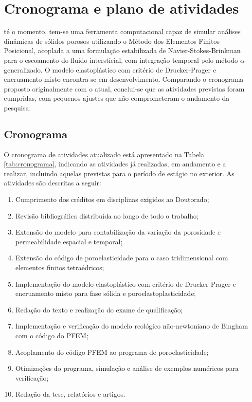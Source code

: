 \chapter{Cronograma e plano de atividades}

té o momento, tem-se uma ferramenta computacional capaz de simular análises dinâmicas de sólidos porosos utilizando o Método dos Elementos Finitos Posicional, acoplada a uma formulação estabilizada de Navier-Stokes-Brinkman para o escoamento do fluido intersticial, com integração temporal pelo método $\alpha$-generalizado. O modelo elastoplástico com critério de Drucker-Prager e encruamento misto encontra-se em desenvolvimento. Comparando o cronograma proposto originalmente com o atual, conclui-se que as atividades previstas foram cumpridas, com pequenos ajustes que não comprometeram o andamento da pesquisa.

\section{Cronograma}

O cronograma de atividades atualizado está apresentado na Tabela \ref{tab:cronograma}, indicando as atividades já realizadas, em andamento e a realizar, incluindo aquelas previstas para o período de estágio no exterior. As atividades são descritas a seguir:

\begin{enumerate}[label=\alph*),leftmargin=\parindent,labelwidth=\parindent,labelsep=0.3cm,noitemsep]
    \item\label{disciplinas} Cumprimento dos créditos em disciplinas exigidos ao Doutorado;
    \item\label{revisao} Revisão bibliográfica distribuída ao longo de todo o trabalho;
    \item\label{porosidade} Extensão do modelo para contabilização da variação da porosidade e permeabilidade espacial e temporal;
    \item\label{extensao3d} Extensão do código de poroelasticidade para o caso tridimensional com elementos finitos tetraédricos;
    \item\label{drucker} Implementação do modelo elastoplástico com critério de Drucker-Prager e encruamento misto para fase sólida e poroelastoplasticidade;
    \item\label{quali} Redação do texto e realização do exame de qualificação;
    \item\label{bingham} Implementação e verificação do modelo reológico não-newtoniano de Bingham com o código do PFEM;
    \item\label{acoplamento} Acoplamento do código PFEM ao programa de poroelasticidade;
    \item\label{valid} Otimizações do programa, simulação e análise de exemplos numéricos para verificação;
    \item\label{redacao} Redação da tese, relatórios e artigos.
\end{enumerate}

